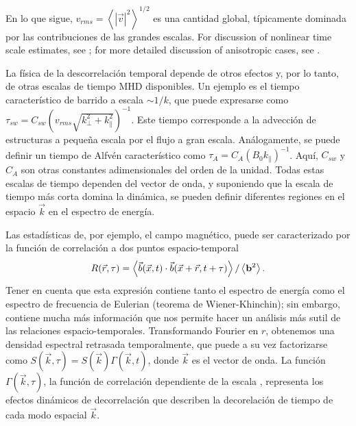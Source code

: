 En lo que sigue,
$v_{rms} = \left\langle |\vec{v}|^2 \right\rangle ^{1/2}$ es una
cantidad global, típicamente dominada por las contribuciones de las
grandes escalas. For discussion of nonlinear time scale estimates, see
\cite{zhou_magnetohydrodynamic_2004}; for more detailed discussion of
anisotropic cases, see \cite{matthaeus_anisotropic_2009}.


La física de la descorrelación temporal depende de otros efectos y,
por lo tanto, de otras escalas de tiempo MHD disponibles. Un ejemplo
es el tiempo característico de barrido a escala $\sim 1/k$, que puede
expresarse como $\tau_{sw} = C_{sw} \left(v_{rms}\sqrt{k^2_\perp +
  k^2_\parallel}\right)^{-1} $. Este tiempo corresponde a la advección
de estructuras a pequeña escala por el flujo a gran
escala. Análogamente, se puede definir un tiempo de Alfvén
característico como $\tau_A = C_A \left(B_0 k_\parallel\right)^{- 1}
$. Aquí, $C_{sw} $ y $C_A$ son otras constantes adimensionales del
orden de la unidad. Todas estas escalas de tiempo dependen del vector
de onda, y suponiendo que la escala de tiempo más corta domina la
dinámica, se pueden definir diferentes regiones en el espacio
$\vec{k}$ en el espectro de energía.

Las estadísticas de, por ejemplo, el campo magnético, puede ser
caracterizado por la función de correlación a dos puntos
espacio-temporal
\begin{equation}
R(\vec{r},\tau) = \left\langle \vec{b}( \vec{x},t) \cdot
  \vec{b}( \vec{x} + \vec{r},t+\tau) \right\rangle / \left\langle {\bf
    b}^2 \right\rangle.
\label{eq:Rbij}
\end{equation}
Tener en cuenta que esta expresión contiene tanto el espectro de
energía como el espectro de frecuencia de Eulerian (teorema de
Wiener-Khinchin); sin embargo, contiene mucha más información que nos
permite hacer un análisis más sutil de las relaciones
espacio-temporales.  Transformando Fourier en $r$, obtenemos una
densidad espectral retrasada temporalmente, que puede a su vez
factorizarse como $S(\vec{k},\tau) = S(\vec{k})\Gamma(\vec{k},t)$,
donde $\vec{k}$ es el vector de onda. La función
$\Gamma(\vec{k},\tau)$, la función de correlación dependiente de la
escala \cite{heisenberg_zur_1948, comte-bellot_simple_1971,
  orszag_numerical_1972}, representa los efectos dinámicos de
decorrelación que describen la decorelación de tiempo de cada modo
espacial $\vec{k}$.

